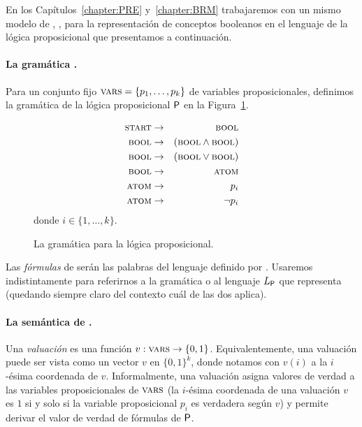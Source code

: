
En los Capítulos~\ref{chapter:PRE} y~\ref{chapter:BRM} trabajaremos con un mismo modelo de \lot, \grambool, para la representación de conceptos booleanos en el lenguaje de la lógica proposicional que presentamos a continuación.

\paragraph{La gramática \grambool.}
Para un conjunto fijo $\textsc{vars}=\{p_1,\dots,p_k\}$ de variables proposicionales, definimos la gramática de la lógica proposicional ${\sf P}$ en la Figura~\ref{fig:grambool}.
%
\renewcommand{\thefigure}{PII.1}
\begin{figure}[h!]
\begin{eqnarray*}
\textsc{start} &\to&\textsc{bool}\\
\textsc{bool} &\to&(\textsc{bool} \wedge \textsc{bool}) \\
\textsc{bool} &\to&(\textsc{bool} \vee \textsc{bool}) \\
\textsc{bool} &\to&\textsc{atom}\\
\textsc{atom} &\to& p_i \\
\textsc{atom} &\to&\lnot p_i 
\end{eqnarray*}
donde $i\in\{1,\dots,k\}$.
\caption{La gramática \grambool para la lógica proposicional.}
\label{fig:grambool}
\end{figure}
%
Las {\em fórmulas} de \grambool serán las palabras del lenguaje definido por \grambool. Usaremos indistintamente \grambool para referirnos a la gramática o al lenguaje $L_{\sf P}$ que representa (quedando siempre claro del contexto cuál de las dos aplica).


\paragraph{La semántica de \grambool.}
Una {\em valuación} es una función $v:\textsc{vars}\to\{0,1\}$. Equivalentemente, una valuación puede ser vista como un vector $v$ en $\{0,1\}^k$, donde notamos con $v(i)$ a la $i$-ésima coordenada de $v$. Informalmente, una valuación asigna valores de verdad a las variables proposicionales de $\textsc{vars}$ (la $i$-ésima coordenada de una valuación $v$ es $1$ si y solo si la variable proposicional $p_i$ es verdadera según $v$) y permite derivar el valor de verdad de fórmulas de ${\sf P}$.  

